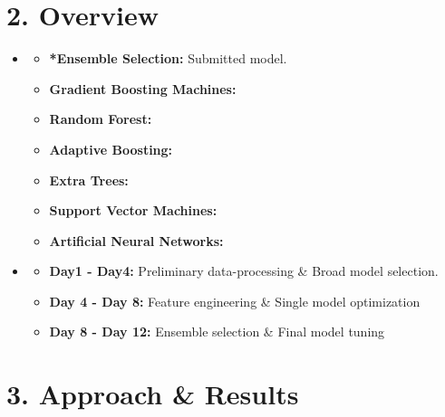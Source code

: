 \section*{2. Overview}
\medskip
\begin{itemize}

    \item {}
    \begin{itemize}
    \item \textbf{*Ensemble Selection:} Submitted model.
    \item \textbf{Gradient Boosting Machines:}
    \item \textbf{Random Forest:}
    \item \textbf{Adaptive Boosting:}
    \item \textbf{Extra Trees:}
    \item \textbf{Support Vector Machines:}
    \item \textbf{Artificial Neural Networks:}
    \end{itemize}

    \item {}
    \begin{itemize}
    \item \textbf{Day1 - Day4:} Preliminary data-processing \& Broad model selection.
    \item \textbf{Day 4 - Day 8:} Feature engineering \& Single model optimization
    \item \textbf{Day 8 - Day 12:} Ensemble selection \& Final model tuning
    \end{itemize}

\end{itemize}


\newpage


\section*{3. Approach \& Results}

